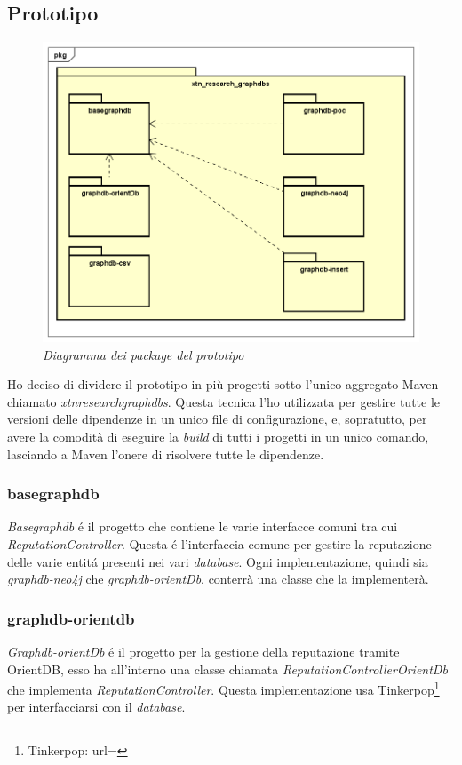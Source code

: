 \subsection{Prototipo}
\begin{figure}[h!]
	\centering
	\includegraphics[scale=0.4]{immagini/packages.png}
	\caption{\textit{Diagramma dei package del prototipo}}
\end{figure}
Ho deciso di dividere il prototipo in più progetti sotto l'unico \gls{aggregato Maven} chiamato \textit{xtn\textunderscore research\textunderscore graphdbs}. Questa tecnica l'ho utilizzata per gestire tutte le versioni delle dipendenze in un unico file di configurazione, e, sopratutto, per avere la comodità di eseguire la \textit{build} di tutti i progetti in un unico comando, lasciando a Maven l'onere di risolvere tutte le dipendenze.\\


\subsubsection{basegraphdb}
\textit{Basegraphdb} é il progetto che contiene le varie interfacce comuni tra cui \textit{ReputationController}. Questa é l'interfaccia comune per gestire la reputazione delle varie entitá presenti nei vari \textit{database}. Ogni implementazione, quindi sia \textit{graphdb-neo4j} che \textit{graphdb-orientDb}, conterrà una classe che la implementerà.
\subsubsection{graphdb-orientdb}
\textit{Graphdb-orientDb} é il progetto per la gestione della reputazione tramite OrientDB, esso ha all'interno una classe chiamata \textit{ReputationControllerOrientDb} che implementa \textit{ReputationController}. Questa implementazione usa Tinkerpop\footnote{Tinkerpop: url=} per interfacciarsi con il \textit{database}.
